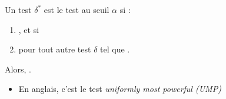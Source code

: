 \documentclass[10pt, french]{article}
\begin{document}
\begin{multicols*}{2}
\begin{definitionNOHFILL}
Un test $\delta^{*}$ est le test  au seuil $\alpha$ si :
\begin{enumerate}
	\item	{}, et si
	\item	pour tout autre test $\delta$ tel que .
\end{enumerate}
Alors, .

\begin{itemize}
	\item	En anglais, c'est le test \og \textit{uniformly most powerful (UMP)} \fg{} 
\end{itemize}
\end{definitionNOHFILL}


%	


\end{multicols*}
\end{document}
